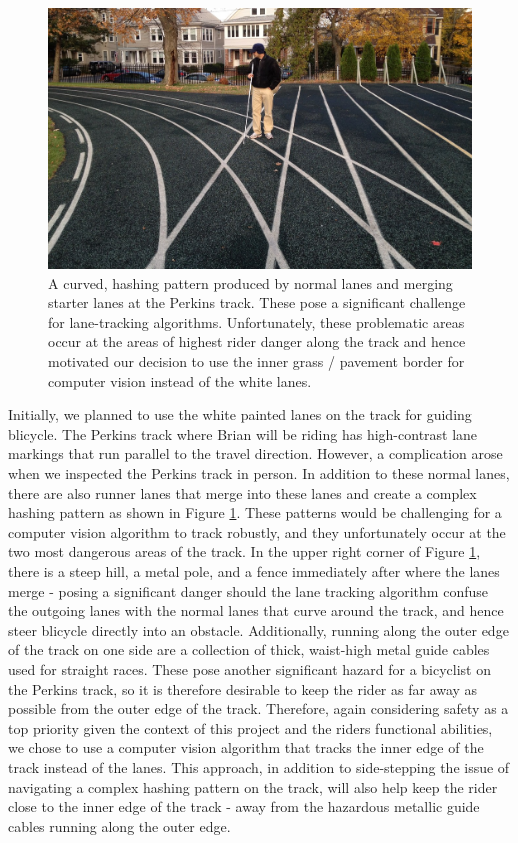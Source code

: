 \documentclass[aps,twocolumn,secnumarabic,balancelastpage,amsmath,amssymb,nofootinbib]{revtex4-1}
\begin{document}
\begin{figure}
\includegraphics[scale=0.18]{track_curved_hash.jpg}
\caption{A curved, hashing pattern produced by normal lanes and merging starter lanes at the Perkins track. These pose a significant challenge for lane-tracking algorithms. Unfortunately, these problematic areas occur at the areas of highest rider danger along the track and hence motivated our decision to  use the inner grass / pavement border for computer vision instead of the white lanes.}
\label{fig:HashingPattern}
\end{figure}

Initially, we planned to use the white painted lanes on the track for guiding blicycle. The Perkins track where Brian will be riding has high-contrast lane markings that run parallel to the travel direction. However, a complication arose when we inspected the Perkins track in person. In addition to these normal lanes, there are also runner lanes that merge into these lanes and create a complex hashing pattern as shown in Figure \ref{fig:HashingPattern}. These patterns would be challenging for a computer vision algorithm to track robustly, and they unfortunately occur at the two most dangerous areas of the track. In the upper right corner of Figure \ref{fig:HashingPattern}, there is a steep hill, a metal pole, and a fence immediately after where the lanes merge - posing a significant danger should the lane tracking algorithm confuse the outgoing lanes with the normal lanes that curve around the track, and hence steer blicycle directly into an obstacle. Additionally, running along the outer edge of the track on one side are a collection of thick, waist-high metal guide cables used for straight races. These pose another significant hazard for a bicyclist on the Perkins track, so it is therefore desirable to keep the rider as far away as possible from the outer edge of the track. Therefore, again considering safety as a top priority given the context of this project and the riders functional abilities, we chose to use a computer vision algorithm that tracks the inner edge of the track instead of the lanes. This approach, in addition to side-stepping the issue of navigating a complex hashing pattern on the track, will also help keep the rider close to the inner edge of the track - away from the hazardous metallic guide cables running along the outer edge.
\end{document}
